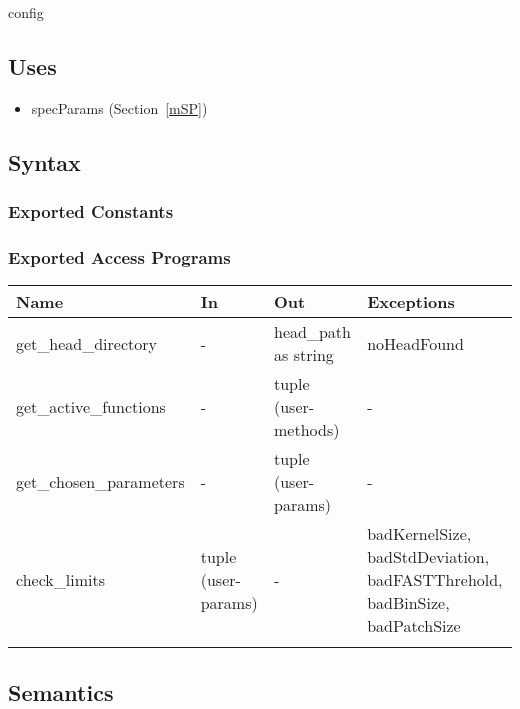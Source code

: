 \documentclass[12pt, titlepage]{article}
\begin{document}
config

\subsection{Uses}
\begin{itemize}
\item specParams (Section~\ref{mSP})
\end{itemize}

\subsection{Syntax}

\subsubsection{Exported Constants}

\subsubsection{Exported Access Programs}
\begin{tabular}{p{4cm} p{4cm} p{4cm} p{3.5cm}}
\hline
\textbf{Name} & \textbf{In} & \textbf{Out} & \textbf{Exceptions} \\
\hline
get\_head\_directory & - & head\_path as string & noHeadFound \\
get\_active\_functions & - & tuple (user-methods) & - \\
get\_chosen\_parameters & - & tuple (user-params) & - \\
check\_limits & tuple (user-params) & - & 
badKernelSize, \newline badStdDeviation, \newline
badFASTThrehold, \newline badBinSize, \newline
badPatchSize\\
\\
\hline
\end{tabular}


\subsection{Semantics}
\end{document}
